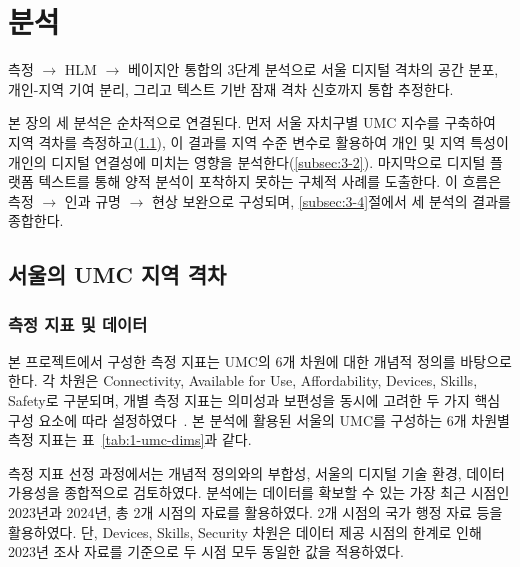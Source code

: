 \section{분석}
\label{sec:analysis}


\begin{quoteblock}
측정 $\rightarrow$ HLM $\rightarrow$ 베이지안 통합의 3단계 분석으로 서울 디지털 격차의 공간 분포, 개인-지역 기여 분리, 그리고 텍스트 기반 잠재 격차 신호까지 통합 추정한다.
\end{quoteblock}


본 장의 세 분석은 순차적으로 연결된다. 먼저 서울 자치구별 UMC 지수를 구축하여 지역 격차를 측정하고(\ref{subsec:3-1}), 이 결과를 지역 수준 변수로 활용하여 개인 및 지역 특성이 개인의 디지털 연결성에 미치는 영향을 분석한다(\ref{subsec:3-2}). 마지막으로 디지털 플랫폼 텍스트를 통해 양적 분석이 포착하지 못하는 구체적 사례를 도출한다. 이 흐름은 측정 $\rightarrow$ 인과 규명 $\rightarrow$ 현상 보완으로 구성되며, \ref{subsec:3-4}절에서 세 분석의 결과를 종합한다.

\subsection{서울의 UMC 지역 격차}
\label{subsec:3-1}

\subsubsection{측정 지표 및 데이터}
\label{subsubsec:3-1-1}

본 프로젝트에서 구성한 측정 지표는 UMC의 6개 차원에 대한 개념적 정의를 바탕으로 한다. 각 차원은 Connectivity, Available for Use, Affordability, Devices, Skills, Safety로 구분되며, 개별 측정 지표는 의미성과 보편성을 동시에 고려한 두 가지 핵심 구성 요소에 따라 설정하였다~\citep{ITU2023}. 본 분석에 활용된 서울의 UMC를 구성하는 6개 차원별 측정 지표는 표~\ref{tab:1-umc-dims}과 같다.

측정 지표 선정 과정에서는 개념적 정의와의 부합성, 서울의 디지털 기술 환경, 데이터 가용성을 종합적으로 검토하였다. 분석에는 데이터를 확보할 수 있는 가장 최근 시점인 2023년과 2024년, 총 2개 시점의 자료를 활용하였다. 2개 시점의 국가 행정 자료 등을 활용하였다. 단, Devices, Skills, Security 차원은 데이터 제공 시점의 한계로 인해 2023년 조사 자료를 기준으로 두 시점 모두 동일한 값을 적용하였다.

